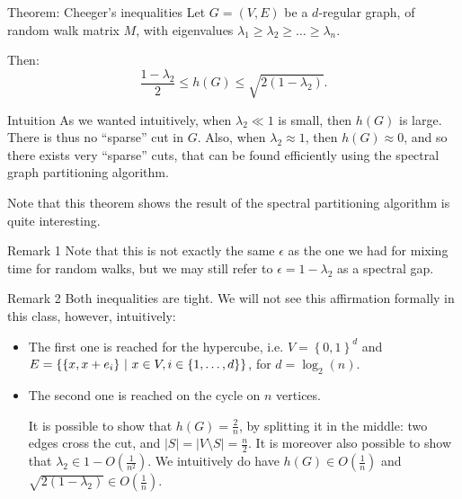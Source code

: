 \documentclass[a4paper]{article}
\begin{document}
\begin{parag}{Theorem: Cheeger's inequalities}
    Let $G = \left(V, E\right)$ be a $d$-regular graph, of random walk matrix $M$, with eigenvalues $\lambda_1 \geq \lambda_2 \geq \ldots \geq \lambda_n$.

    Then:
    \[\frac{1 - \lambda_2}{2} \leq h\left(G\right) \leq \sqrt{2 \left(1 - \lambda_2\right)}.\]

    \begin{subparag}{Intuition}
        As we wanted intuitively, when $\lambda_2 \ll 1$ is small, then $h\left(G\right)$ is large. There is thus no ``sparse'' cut in $G$. Also, when $\lambda_2 \approx 1$, then $h\left(G\right) \approx 0$, and so there exists very ``sparse'' cuts, that can be found efficiently using the spectral graph partitioning algorithm.

        Note that this theorem shows the result of the spectral partitioning algorithm is quite interesting.
    \end{subparag}
   
    \begin{subparag}{Remark 1}
        Note that this is not exactly the same $\epsilon$ as the one we had for mixing time for random walks, but we may still refer to $\epsilon = 1 - \lambda_2$ as a spectral gap.
    \end{subparag}

    \begin{subparag}{Remark 2}
        Both inequalities are tight. We will not see this affirmation formally in this class, however, intuitively:
        \begin{itemize}[left=0pt]
            \item The first one is reached for the hypercube, i.e. $V = \left\{0, 1\right\}^d$ and $E = \left\{\left\{x, x + e_i\right\} \suchthat x \in V, i \in \left\{1, \ldots, d\right\}\right\}$, for $d = \log_2\left(n\right)$.
            \item The second one is reached on the cycle on $n$ vertices.

                It is possible to show that $h\left(G\right) = \frac{2}{n}$, by splitting it in the middle: two edges cross the cut, and $\left|S\right| = \left|V \setminus S\right| = \frac{n}{2}$. It is moreover also possible to show that $\lambda_2 \in 1 - O\left(\frac{1}{n^2}\right)$. We intuitively do have $h\left(G\right) \in O\left(\frac{1}{n}\right)$ and $\sqrt{2\left(1 - \lambda_2\right)} \in O\left(\frac{1}{n}\right)$.
        \end{itemize}
    \end{subparag}


\end{parag}
\end{document}

